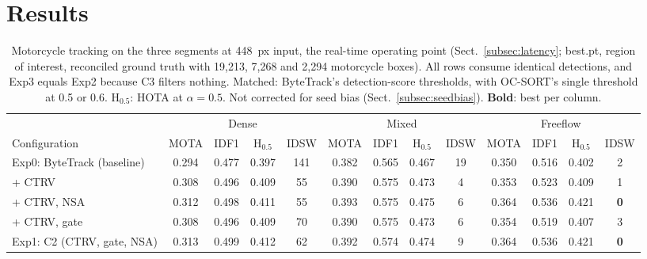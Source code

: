 \documentclass[twocolumn]{svjour3}
\begin{document}
\section{Results}\label{sec:results}

\begin{table}[t]
\caption{Motorcycle tracking on the three segments at 448~px input, the
real-time operating point (Sect.~\ref{subsec:latency}; best.pt, region of
interest, reconciled ground truth with 19,213, 7,268 and 2,294 motorcycle
boxes). All rows consume identical detections, and Exp3 equals Exp2 because C3
filters nothing. Matched: ByteTrack's detection-score thresholds, with OC-SORT's
single threshold at 0.5 or 0.6. $\mathrm{H}_{0.5}$: HOTA at $\alpha=0.5$. Not
corrected for seed bias (Sect.~\ref{subsec:seedbias}). \textbf{Bold}: best per
column.}
\label{tab:ablation}
\footnotesize
\setlength{\tabcolsep}{3.5pt}
\begin{tabular*}{\textwidth}{@{\extracolsep\fill}lcccccccccccc@{}}
\toprule
 & \multicolumn{4}{c}{Dense} & \multicolumn{4}{c}{Mixed} & \multicolumn{4}{c}{Freeflow} \\
\cmidrule(lr){2-5}\cmidrule(lr){6-9}\cmidrule(l){10-13}
Configuration & MOTA & IDF1 & $\mathrm{H}_{0.5}$ & IDSW & MOTA & IDF1 & $\mathrm{H}_{0.5}$ & IDSW & MOTA & IDF1 & $\mathrm{H}_{0.5}$ & IDSW \\
\midrule
Exp0: ByteTrack (baseline)   & 0.294 & 0.477 & 0.397 & 141 & 0.382 & 0.565 & 0.467 & 19 & 0.350 & 0.516 & 0.402 & 2 \\
\quad + CTRV                 & 0.308 & 0.496 & 0.409 & 55 & 0.390 & 0.575 & 0.473 & 4 & 0.353 & 0.523 & 0.409 & 1 \\
\quad + CTRV, NSA            & 0.312 & 0.498 & 0.411 & 55 & 0.393 & 0.575 & 0.475 & 6 & 0.364 & 0.536 & 0.421 & \textbf{0} \\
\quad + CTRV, gate           & 0.308 & 0.496 & 0.409 & 70 & 0.390 & 0.575 & 0.473 & 6 & 0.354 & 0.519 & 0.407 & 3 \\
Exp1: C2 (CTRV, gate, NSA)   & 0.313 & 0.499 & 0.412 & 62 & 0.392 & 0.574 & 0.474 & 9 & 0.364 & 0.536 & 0.421 & \textbf{0} \\

\end{tabular*}
\end{table}
\end{document}
